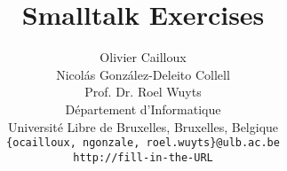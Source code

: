 \let\wholebook=\relax


\title{Smalltalk Exercises}
\author{Olivier Cailloux \\
Nicol\'as Gonz\'alez-Deleito Collell \\
Prof. Dr. Roel Wuyts \\
{\small D\'{e}partement d'Informatique}\\
{\small Universit\'{e} Libre de Bruxelles, Bruxelles, Belgique} \\
{\small {\tt \{ocailloux, ngonzale, roel.wuyts\}@ulb.ac.be}}\\
{\small {\tt http://fill-in-the-URL}}}


\maketitle







